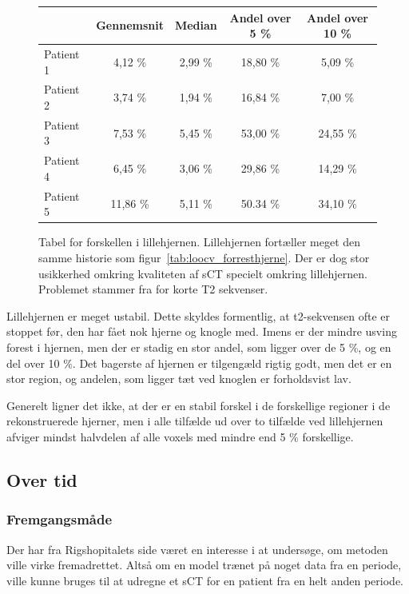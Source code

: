 \begin{figure}
    \centering
    \begin{tabular}{| l | c | c | c | c |}
        \hline
         & Gennemsnit & Median & Andel over 5 \% & Andel over 10 \% \\ \hline
        Patient 1 & 4,12 \% & 2,99 \% & 18,80 \% & 5,09 \% \\ \hline
        Patient 2 & 3,74 \% & 1,94 \% & 16,84 \% & 7,00 \% \\ \hline
        Patient 3 & 7,53 \% & 5,45 \% & 53,00 \% & 24,55 \% \\ \hline
        Patient 4 & 6,45 \% & 3,06 \% & 29,86 \% & 14,29 \% \\ \hline
        Patient 5 & 11,86 \% & 5,11 \% & 50.34 \% & 34,10 \% \\ \hline
    \end{tabular}
    \caption{Tabel for forskellen i lillehjernen. Lillehjernen fortæller meget den samme historie som figur~\ref{tab:loocv_forresthjerne}. Der er dog stor usikkerhed omkring kvaliteten af sCT specielt omkring lillehjernen. Problemet stammer fra for korte T2 sekvenser.}
    \label{tab:loocv_lillehjerne}
\end{figure}


Lillehjernen er meget ustabil. Dette skyldes formentlig, at t2-sekvensen
ofte er stoppet før, den har fået nok hjerne og knogle med. Imens er der
mindre usving forest i hjernen, men der er stadig en stor andel, som
ligger over de 5 \%, og en del over 10 \%. Det bagerste af hjernen er
tilgengæld rigtig godt, men det er en stor region, og andelen, som ligger
tæt ved knoglen er forholdsvist lav.

Generelt ligner det ikke, at der er en stabil forskel i de forskellige
regioner i de rekonstruerede hjerner, men i alle tilfælde ud over to
tilfælde ved lillehjernen afviger mindst halvdelen af alle voxels med
mindre end 5 \% forskellige.


\subsection{Over tid}
\subsubsection{Fremgangsmåde}

Der har fra Rigshopitalets side været en interesse i at undersøge, om
metoden ville virke fremadrettet. Altså om en model trænet på noget data
fra en periode, ville kunne bruges til at udregne et sCT for en patient
fra en helt anden periode. 


